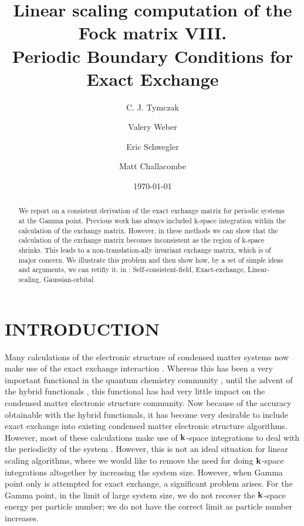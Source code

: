 \documentclass[prb,aps,nobibnotes,twocolumn,doublespace,twocolumngrid,superbib]{revtex4}
\begin{document}
\title{Linear scaling computation of the Fock matrix VIII. \\
       Periodic Boundary Conditions for Exact Exchange}

\author{C. J. Tymczak}
\author{Valery Weber}
\author{Eric Schwegler}
\author{Matt Challacombe}


\date{\today}

\begin{abstract}
We report on a consistent derivation of the exact exchange matrix for periodic
systems at the Gamma point. Previous work has always included k-space integration 
within the calculation of the exchange matrix. However, in  these methods
we can show that the calculation of the exchange matrix becomes inconsistent as the
region of k-space shrinks. This leads to a non-translation-ally invariant exchange matrix,
which is of major concern. We illustrate this problem and then show how, by a set of
simple ideas and arguments, we can retifiy it.
%
 in
: Self-consistent-field, Exact-exchange, Linear-scaling, Gaussian-orbital 
%
\end{abstract}

\pacs{}

\maketitle



\section{INTRODUCTION}
Many calculations of the electronic structure of condensed matter systems now make use
of the exact exchange interaction 
\cite{Pisani80,REvarestov83,MCausa88,JAlmlof94,RDovesi00}. 
Whereas this has been a very
important functional in the quantum chemistry community 
\cite{PLowdin55,py,ASzabo89}, 
until the advent of the hybrid functionals 
\cite{Gill92,Becke93,ABecke96,Adamo99}, 
this functional has had very little impact on the
condensed matter electronic structure community. Now because of the accuracy obtainable with
the hybrid functionals, it has become very desirable to include exact exchange into
existing condensed matter electronic structure algorithms. 
However, most of these calculations make use of ${\bf k}$-space integrations to 
deal with the periodicity of the system \cite{RDovesi00}. However, this is not an ideal situation 
for linear scaling algorithms, where we would like to remove the need for doing
${\bf k}$-space integrations altogether by increasing the system size. 
However, when Gamma point only is attempted for exact exchange, a 
significant problem arises. For the Gamma point, in the limit of large system size,
we do not recover the ${\bf k}$-space energy per particle number; we do not have the correct
limit as particle number increases.  
%
\end{document}
